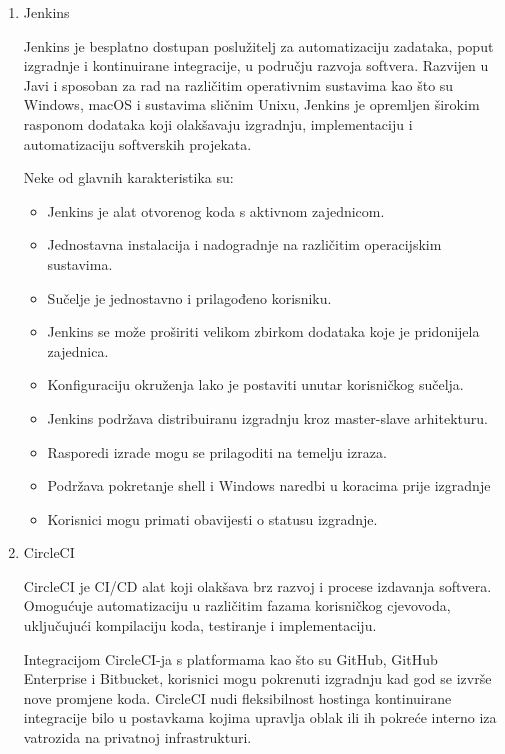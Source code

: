 \documentclass[a4paper,12pt,oneside]{article}
\begin{document}
\begin{enumerate}
\item 
Jenkins 

Jenkins \cite{jenkins} je besplatno dostupan poslužitelj za automatizaciju zadataka, poput izgradnje i kontinuirane integracije, u području razvoja softvera. Razvijen u Javi i sposoban za rad na različitim operativnim sustavima kao što su Windows, macOS i sustavima sličnim Unixu, Jenkins je opremljen širokim rasponom dodataka koji olakšavaju izgradnju, implementaciju i automatizaciju softverskih projekata.

Neke od glavnih karakteristika su:
\begin{itemize}
\item Jenkins je alat otvorenog koda s aktivnom zajednicom.
\item Jednostavna instalacija i nadogradnje na različitim operacijskim sustavima.
\item Sučelje je jednostavno i prilagođeno korisniku.
\item Jenkins se može proširiti velikom zbirkom dodataka koje je pridonijela zajednica.
\item Konfiguraciju okruženja lako je postaviti unutar korisničkog sučelja.
\item Jenkins podržava distribuiranu izgradnju kroz master-slave arhitekturu.
\item Rasporedi izrade mogu se prilagoditi na temelju izraza.
\item Podržava pokretanje shell i Windows naredbi u koracima prije izgradnje
\item Korisnici mogu primati obavijesti o statusu izgradnje.
\end{itemize}

\item 
CircleCI 

CircleCI \cite{circleCI} je CI/CD alat koji olakšava brz razvoj i procese izdavanja softvera. Omogućuje automatizaciju u različitim fazama korisničkog cjevovoda, uključujući kompilaciju koda, testiranje i implementaciju.

Integracijom CircleCI-ja s platformama kao što su GitHub, GitHub Enterprise i Bitbucket, korisnici mogu pokrenuti izgradnju kad god se izvrše nove promjene koda. CircleCI nudi fleksibilnost hostinga kontinuirane integracije bilo u postavkama kojima upravlja oblak ili ih pokreće interno iza vatrozida na privatnoj infrastrukturi.


\end{enumerate}
\end{document}
